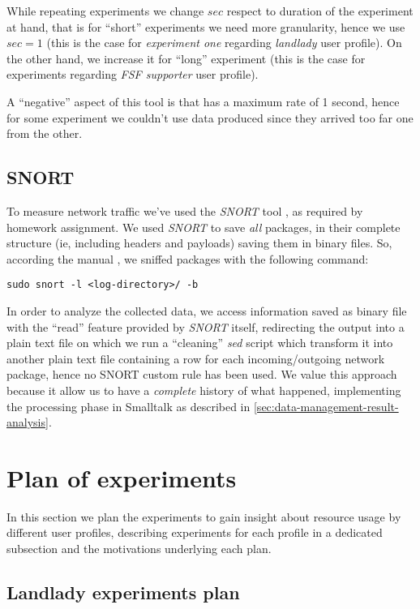 \documentclass[10pt,a4paper]{article}
\begin{document}
    While repeating experiments we change $sec$ respect to duration of
    the experiment at hand, that is for ``short'' experiments we need
    more granularity, hence we use $sec = 1$ (this is the case for
    \emph{experiment one} regarding \emph{landlady} user profile). On
    the other hand, we increase it for ``long'' experiment (this is
    the case for experiments regarding \emph{FSF supporter} user
    profile).

    A ``negative'' aspect of this tool is that has a maximum rate of 1
    second, hence for some experiment we couldn't use data produced
    since they arrived too far one from the other.

    \subsection{SNORT} 
    To measure network traffic we've used the \emph{SNORT} tool
    \cite{SNORT}, as required by homework assignment. We used
    \emph{SNORT} to save \emph{all} packages, in their complete
    structure (ie, including headers and payloads) saving them in
    binary files.  So, according the manual \cite{SNORT-manual}, we
    sniffed packages with the following command:
\begin{verbatim}
sudo snort -l <log-directory>/ -b
\end{verbatim}
    In order to analyze the collected data, we access information
    saved as binary file with the ``read'' feature provided by
    \emph{SNORT} itself, redirecting the output into a plain text file
    on which we run a ``cleaning'' \emph{sed}\cite{sed} script which
    transform it into another plain text file containing a row for
    each incoming/outgoing network package, hence no SNORT custom rule
    has been used. We value this approach because it allow us to have
    a \emph{complete} history of what happened, implementing the
    processing phase in Smalltalk as described in
    \autoref{sec:data-management-result-analysis}.

    \newpage
    \section{Plan of experiments}
    \label{sec:plan-of-experiment}
    In this section we plan the experiments to gain insight about
    resource usage by different user profiles, describing experiments
    for each profile in a dedicated subsection and the motivations
    underlying each plan.

    \subsection{Landlady experiments plan}
\end{document}
